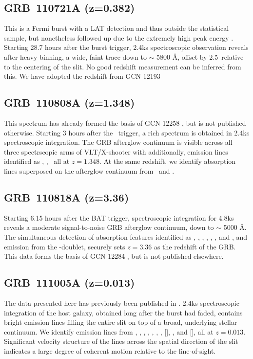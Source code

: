 \documentclass{aa}    %
\begin{document}
\subsection{GRB~110721A (z=0.382)} \label{110721}

This is a Fermi burst with a LAT detection and thus outside the statistical
sample, but nonetheless followed up due to the extremely high peak energy
\citep{Axelsson2012}. Starting 28.7 hours after the burst trigger, 2.4ks
spectroscopic observation reveals after heavy binning, a wide, faint trace down
to $\sim$ 5800 \AA, offset by 2.5\arcsec~relative to the centering of the slit.
No good redshift measurement can be inferred from this. We have adopted the
redshift from GCN  12193 \citep{GCN12193}


\subsection{GRB~110808A (z=1.348)} \label{110808}

This spectrum has already formed the basis of GCN 12258 \citep{GCN12258}, but is
not published otherwise. Starting 3 hours after the \swift~trigger, a rich
spectrum is obtained in 2.4ks spectroscopic integration. The GRB afterglow
continuum is visible across all three spectrscopic arms of VLT/X-shooter with
additionally, emission lines identified as \oii, \oiii, \ha~all at $z = 1.348$.
At the same redshift, we identify absorption lines superposed on the afterglow
continuum from \mgii~and \feii.

\subsection{GRB~110818A (z=3.36)} \label{110818}

Starting 6.15 hours after the BAT trigger, spectroscopic integration for 4.8ks
reveals a moderate signal-to-noise GRB afterglow continuum, down to $\sim$ 5000
\AA. The simultaneous detection of absorption features identified as \lya,
\SIii, \civ, \alii, \cah, \cak, and \mgii, and emission from the \oiii-doublet,
securely sets $z = 3.36$ as the redshift of the GRB. This data forms the basis
of GCN 12284 \citep{GCN12284}, but is not published elsewhere.

\subsection{GRB~111005A (z=0.013)} \label{111005}

The data presented here has previously been published in \citet{Michaowski2016}.
2.4ks spectroscopic integration of the host galaxy, obtained long after the
burst had faded, contains bright emission lines filling the entire slit on top
of a broad, underlying stellar continuum. We identify emission lines from \oii,
\hd, \hg, \hb, \oiii, \nii, \hb, [\sii], \ariii, and [\siii], all at $z=0.013$.
Significant velocity structure of the lines across the spatial direction of the
slit indicates a large degree of coherent motion relative to the line-of-sight.
\end{document}
